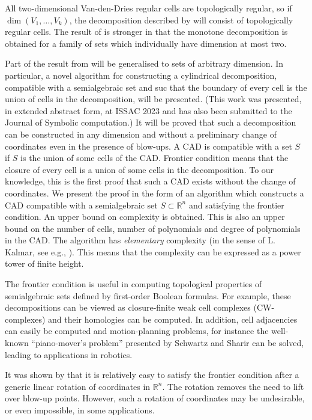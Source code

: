 \documentclass[
]{book}
\theoremstyle{definition}
\theoremstyle{definition}
\theoremstyle{definition}
\theoremstyle{definition}
\theoremstyle{remark}
\begin{document}
All two-dimensional Van-den-Dries regular cells are topologically regular, so if \(\dim(V_1,\ldots,V_k)\), the
decomposition described by \citet{vdd1998} will consist of topologically regular cells. The result of \citet{bgv15} is stronger in that the monotone decomposition is obtained for a family of sets which individually have dimension at most two.

Part of the result from \citet{bgv15} will be generalised to sets of arbitrary dimension. In particular, a novel algorithm for constructing a cylindrical decomposition, compatible with a semialgebraic set and suc that the boundary of every cell is the union of cells in the decomposition, will be presented. (This work was presented, in extended abstract form, at ISSAC 2023 and has also been submitted to the Journal of Symbolic computation.)
It will be proved that such a decomposition can be constructed in any dimension and without a preliminary change of coordinates even in the presence of blow-ups. A CAD is compatible with a set \(S\) if \(S\) is the union of some cells of the CAD. Frontier condition means that the closure of every cell is a union of some cells in the decomposition.
To our knowledge, this is the first proof that such a CAD exists without the change of coordinates.
We present the proof in the form of an algorithm which constructs a CAD compatible with a semialgebraic set \(S \subset \mathbb{R}^n\) and satisfying the frontier condition.
An upper bound on complexity is obtained. This is also an upper bound on the number of cells, number of polynomials and degree of polynomials in the CAD. The algorithm has \emph{elementary} complexity (in the sense of L. Kalmar, see e.g.,
\citep[\(\S 57\)]{kleene1952}). This means that the complexity can be expressed as a power tower of finite height.

The frontier condition is useful in computing topological properties of semialgebraic sets defined by first-order Boolean formulas. For example, these decompositions can be viewed as closure-finite weak cell complexes (CW-complexes) and their homologies can be computed. In addition, cell adjacencies can easily be computed and motion-planning problems, for instance the well-known ``piano-mover's problem'' presented by Schwartz and Sharir can be solved, leading to applications in robotics.

It was shown by \citet{pianomovers1983} that it is relatively easy to satisfy the frontier condition after a generic linear rotation of coordinates in \(\mathbb{R}^n\). The rotation removes the need to lift over blow-up points. However, such a rotation of coordinates may be undesirable, or even impossible, in some applications.
\end{document}
